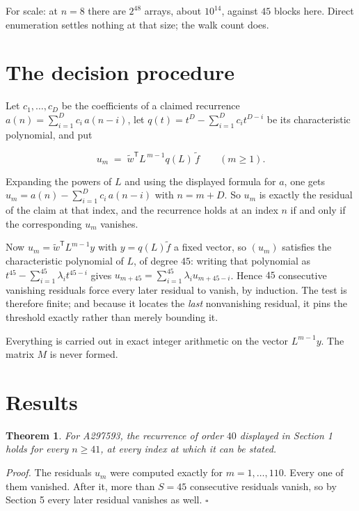 \documentclass[11pt]{article}
\newtheorem{theorem}{Theorem}
\theoremstyle{definition}
\begin{document}
For scale: at $n = 8$ there are $2^{48}$ arrays, about $10^{14}$, against $45$ blocks here. Direct enumeration settles nothing at that size; the walk count does.

\section{The decision procedure}

Let $c_1,\dots,c_D$ be the coefficients of a claimed recurrence $a(n) = \sum_{i=1}^{D} c_i\,a(n-i)$, let $q(t) = t^{D} - \sum_{i=1}^{D} c_i t^{D-i}$ be its characteristic polynomial, and put

\[u_m \;=\; \tilde w^{\mathsf T} L^{\,m-1} q(L)\,\tilde f \qquad (m \ge 1).\]

Expanding the powers of $L$ and using the displayed formula for $a$, one gets $u_m = a(n) - \sum_{i=1}^{D} c_i\,a(n-i)$ with $n = m + D$. So $u_m$ is exactly the residual of the claim at that index, and the recurrence holds at an index $n$ if and only if the corresponding $u_m$ vanishes.

Now $u_m = \tilde w^{\mathsf T} L^{m-1} y$ with $y = q(L)\tilde f$ a fixed vector, so $(u_m)$ satisfies the characteristic polynomial of $L$, of degree $45$: writing that polynomial as $t^{45} - \sum_{i=1}^{45} \lambda_i t^{45-i}$ gives $u_{m+45} = \sum_{i=1}^{45} \lambda_i u_{m+45-i}$. Hence $45$ consecutive vanishing residuals force every later residual to vanish, by induction. The test is therefore finite; and because it locates the {\itshape last} nonvanishing residual, it pins the threshold exactly rather than merely bounding it.

Everything is carried out in exact integer arithmetic on the vector $L^{m-1}y$. The matrix $M$ is never formed.

\section{Results}

\begin{theorem} For A297593, the recurrence of order $40$ displayed in Section 1 holds for every $n \ge 41$, at every index at which it can be stated.\end{theorem}

{\itshape Proof.} The residuals $u_m$ were computed exactly for $m = 1,\dots,110$. Every one of them vanished. After it, more than $S = 45$ consecutive residuals vanish, so by Section 5 every later residual vanishes as well. $\square$
\end{document}
